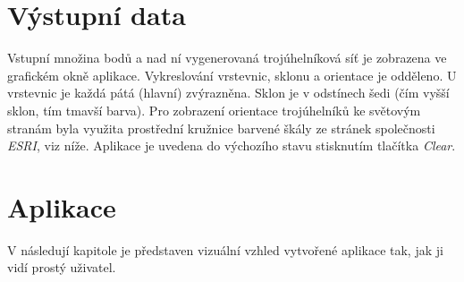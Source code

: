 \documentclass[a4paper, 12pt]{article}
\begin{document}
\section{Výstupní data}
Vstupní množina bodů a nad ní vygenerovaná trojúhelníková síť je zobrazena ve grafickém okně aplikace. Vykreslování vrstevnic, sklonu a orientace je odděleno. U vrstevnic je každá pátá (hlavní) zvýrazněna. Sklon je v odstínech šedi (čím vyšší sklon, tím tmavší barva). Pro zobrazení orientace trojúhelníků ke světovým stranám byla využita prostřední kružnice barvené škály ze stránek společnosti \textit{ESRI}, viz níže. Aplikace je uvedena do výchozího stavu stisknutím tlačítka \textsl{Clear}.\\


\clearpage
\section{Aplikace}
V následují kapitole je představen vizuální vzhled vytvořené aplikace tak, jak ji vidí prostý uživatel.
\end{document}

